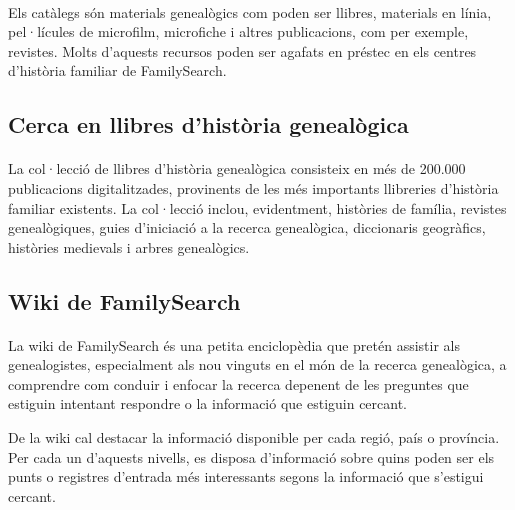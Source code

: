         \paragraph{}
        Els catàlegs són materials genealògics com poden ser llibres, materials en línia, pel·lícules de microfilm, microfiche i altres publicacions, com per exemple, revistes. Molts d’aquests recursos poden ser agafats en préstec en els centres d’història familiar de FamilySearch.


    \subsection{Cerca en llibres d'història genealògica}

        \paragraph{}
        La col·lecció de llibres d’història genealògica consisteix en més de 200.000 pu\-bli\-ca\-cions digitalitzades, provinents de les més importants llibreries d’història fa\-mi\-liar e\-xis\-tents. La col·lecció inclou, evidentment, històries de família, revistes ge\-nea\-lò\-gi\-ques, guies d’iniciació a la recerca genealògica, diccionaris geogràfics, històries medievals i arbres genealògics.


    \subsection{Wiki de FamilySearch}

        \paragraph{}
        La wiki de FamilySearch és una petita enciclopèdia que pretén assistir als genealogistes, especialment als nou vinguts en el món de la recerca genealògica, a comprendre com conduir i enfocar la recerca depenent de les preguntes que estiguin intentant respondre o la informació que estiguin cercant.

        De la wiki cal destacar la informació disponible per cada regió, país o província. Per cada un d'aquests nivells, es disposa d'informació sobre quins poden ser els punts o registres d’entrada més interessants segons la informació que s'estigui cercant.
